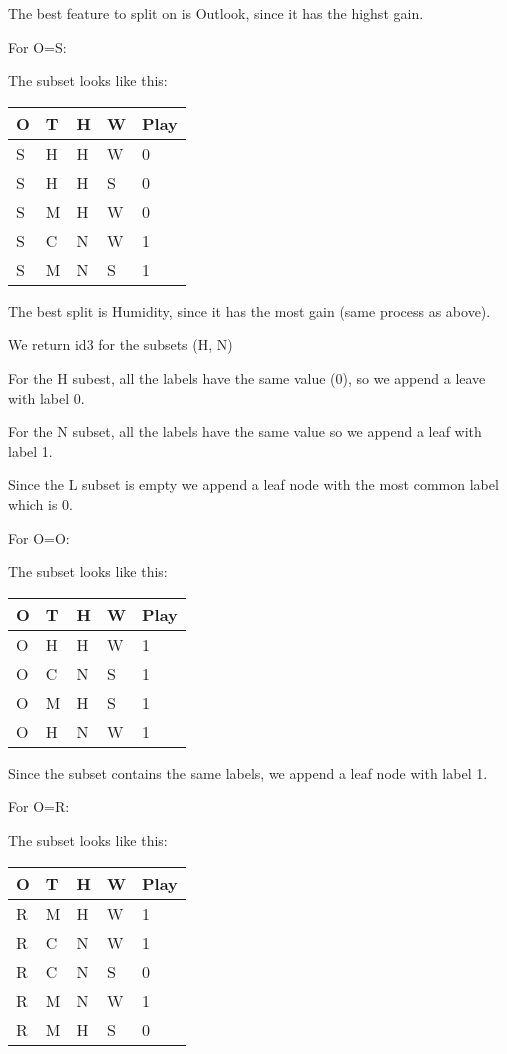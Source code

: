 \documentclass[12pt, fullpage,letterpaper]{article}
\begin{document}
\begin{enumerate}
\begin{enumerate}
The best feature to split on is Outlook, since it has the highst gain. 

For O=S:

The subset looks like this:

\begin{tabular}{|l|l|l|l|l|}
	\hline
	O & T & H & W & Play \\ \hline
	S & H & H & W & 0    \\ \hline
	S & H & H & S & 0    \\ \hline
	S & M & H & W & 0    \\ \hline
	S & C & N & W & 1    \\ \hline
	S & M & N & S & 1    \\ \hline
	\end{tabular}

The best split is Humidity, since it has the most gain (same process as above).

We return id3 for the subsets (H, N)

For the H subest, all the labels have the same value (0), so we append a leave with label 0.

For the N subset, all the labels have the same value so we append a leaf with label 1.

Since the L subset is empty  we append a leaf node with the most common label which is 0. 

For O=O:

The subset looks like this:

\begin{tabular}{|l|l|l|l|l|}
	\hline
	O & T & H & W & Play \\ \hline
	O & H & H & W & 1    \\ \hline
	O & C & N & S & 1    \\ \hline
	O & M & H & S & 1    \\ \hline
	O & H & N & W & 1    \\ \hline
	\end{tabular}


Since the subset contains the same labels, we append a leaf node with label 1.

For O=R:

The subset looks like this:

\begin{tabular}{|l|l|l|l|l|}
	\hline
	O & T & H & W & Play \\ \hline
	R & M & H & W & 1    \\ \hline
	R & C & N & W & 1    \\ \hline
	R & C & N & S & 0    \\ \hline
	R & M & N & W & 1    \\ \hline
	R & M & H & S & 0    \\ \hline
	\end{tabular}



\end{enumerate}
\end{enumerate}
\end{document}
